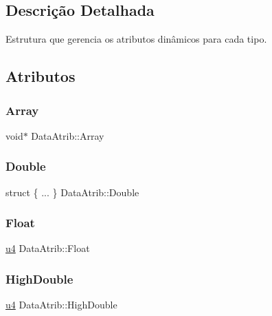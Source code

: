 \subsection{Descrição Detalhada}
Estrutura que gerencia os atributos dinâmicos para cada tipo. 

\subsection{Atributos}
\mbox{\label{unionDataAtrib_a1cd92c3acf2b8cbe2889f0b766661f1d}} 
\subsubsection{\texorpdfstring{Array}{Array}}
{\footnotesize\ttfamily void$\ast$ Data\+Atrib\+::\+Array}

\mbox{\label{unionDataAtrib_ab9a5f070a06a259aad6e82f068fc305f}} 
\subsubsection{\texorpdfstring{Double}{Double}}
{\footnotesize\ttfamily struct \{ ... \}  Data\+Atrib\+::\+Double}

\mbox{\label{unionDataAtrib_abf1cacd5fc8d6219aa5bea2dc474f89a}} 
\subsubsection{\texorpdfstring{Float}{Float}}
{\footnotesize\ttfamily \hyperlink{ClassLoader_8h_aedf6ddc03df8caaaccbb4c60b9a9b850}{u4} Data\+Atrib\+::\+Float}

\mbox{\label{unionDataAtrib_ae701e4461c45e996636b301026eec3e1}} 
\subsubsection{\texorpdfstring{High\+Double}{HighDouble}}
{\footnotesize\ttfamily \hyperlink{ClassLoader_8h_aedf6ddc03df8caaaccbb4c60b9a9b850}{u4} Data\+Atrib\+::\+High\+Double}

